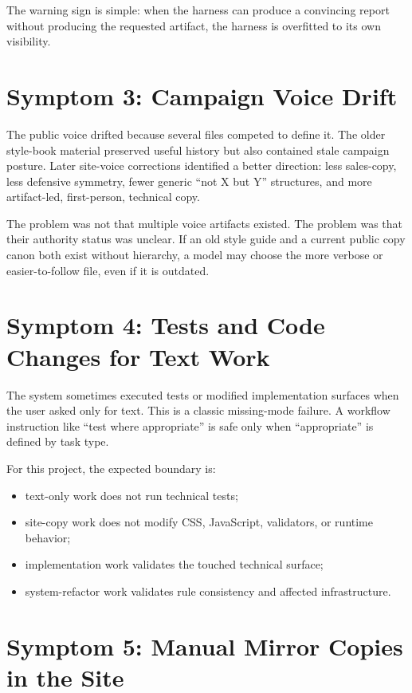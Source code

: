 \documentclass[a4paper,11pt,openany]{report}
\begin{document}
The warning sign is simple: when the harness can produce a convincing report
without producing the requested artifact, the harness is overfitted to its own
visibility.

\section{Symptom 3: Campaign Voice Drift}

The public voice drifted because several files competed to define it. The older
style-book material preserved useful history but also contained stale campaign
posture. Later site-voice corrections identified a better direction: less
sales-copy, less defensive symmetry, fewer generic ``not X but Y'' structures,
and more artifact-led, first-person, technical copy.

The problem was not that multiple voice artifacts existed. The problem was that
their authority status was unclear. If an old style guide and a current public
copy canon both exist without hierarchy, a model may choose the more verbose or
easier-to-follow file, even if it is outdated.

\section{Symptom 4: Tests and Code Changes for Text Work}

The system sometimes executed tests or modified implementation surfaces when the
user asked only for text. This is a classic missing-mode failure. A workflow
instruction like ``test where appropriate'' is safe only when ``appropriate'' is
defined by task type.

For this project, the expected boundary is:

\begin{itemize}
  \item text-only work does not run technical tests;
  \item site-copy work does not modify CSS, JavaScript, validators, or runtime
    behavior;
  \item implementation work validates the touched technical surface;
  \item system-refactor work validates rule consistency and affected
    infrastructure.
\end{itemize}

\section{Symptom 5: Manual Mirror Copies in the Site}
\end{document}
